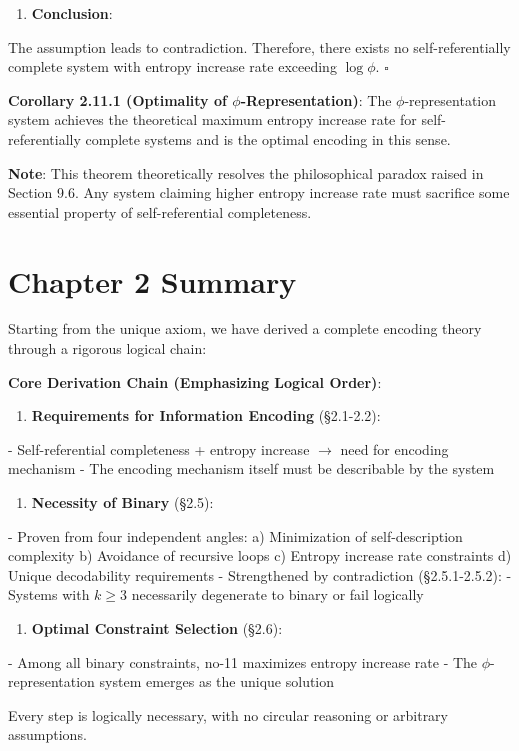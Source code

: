 \begin{enumerate}
\item \textbf{Conclusion}:
\end{enumerate}
   The assumption leads to contradiction. Therefore, there exists no self-referentially complete system with entropy increase rate exceeding $\log \phi$. $\square$

\textbf{Corollary 2.11.1 (Optimality of $\phi$-Representation)}:
\label{cor:2.11.1}
The $\phi$-representation system achieves the theoretical maximum entropy increase rate for self-referentially complete systems and is the optimal encoding in this sense.

\textbf{Note}:
This theorem theoretically resolves the philosophical paradox raised in Section 9.6. Any system claiming higher entropy increase rate must sacrifice some essential property of self-referential completeness.

\section{Chapter 2 Summary}
\label{sec:ch02_encoding:chapter-2-summary}

Starting from the unique axiom, we have derived a complete encoding theory through a rigorous logical chain:

\textbf{Core Derivation Chain (Emphasizing Logical Order)}:

\begin{enumerate}
\item \textbf{Requirements for Information Encoding} (\S2.1-2.2):
\end{enumerate}
   - Self-referential completeness + entropy increase $\rightarrow$ need for encoding mechanism
   - The encoding mechanism itself must be describable by the system

\begin{enumerate}
\item \textbf{Necessity of Binary} (\S2.5):
\end{enumerate}
   - Proven from four independent angles:
     a) Minimization of self-description complexity
     b) Avoidance of recursive loops
     c) Entropy increase rate constraints
     d) Unique decodability requirements
   - Strengthened by contradiction (\S2.5.1-2.5.2):
     - Systems with $k \geq 3$ necessarily degenerate to binary or fail logically

\begin{enumerate}
\item \textbf{Optimal Constraint Selection} (\S2.6):
\end{enumerate}
   - Among all binary constraints, no-11 maximizes entropy increase rate
   - The $\phi$-representation system emerges as the unique solution

Every step is logically necessary, with no circular reasoning or arbitrary assumptions.

